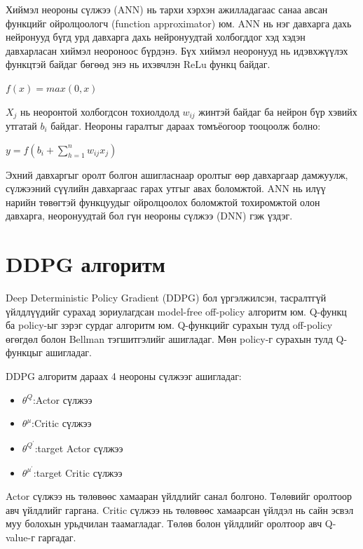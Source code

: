 \documentclass[12pt,A4]{report}
\begin{document}
Хиймэл неороны сүлжээ (ANN) нь тархи хэрхэн ажилладагаас санаа авсан функцийг ойролцоологч (function approximator) юм. ANN нь нэг давхарга дахь нейронууд бүгд урд давхарга дахь нейронуудтай холбогддог хэд хэдэн давхарласан хиймэл неороноос бүрдэнэ. Бүх хиймэл неоронууд нь идэвхжүүлэх функцтэй байдаг бөгөөд энэ нь ихэвчлэн ReLu функц байдаг. 

\begin{center}
$f(x)=max(0, x)$
\end{center}

$X_j$ нь неоронтой холбогдсон тохиолдолд $w_{ij}$ жинтэй байдаг ба нейрон бүр хэвийх утгатай $b_i$ байдаг. Неороны гаралтыг дараах томъёогоор тооцоолж болно:

\begin{center}
$y=f(b_i+\sum_{h=1}^{n}w_{ij} x_j)$
\end{center}

Эхний давхаргыг оролт болгон ашигласнаар оролтыг өөр давхаргаар дамжуулж, сүлжээний сүүлийн давхаргаас гарах утгыг авах боломжтой. ANN нь илүү нарийн төвөгтэй функцуудыг ойролцоолох боломжтой тохиромжтой олон давхарга, неоронуудтай бол гүн неороны сүлжээ (DNN) гэж үздэг. 

\section{DDPG алгоритм}

Deep Deterministic Policy Gradient (DDPG) бол үргэлжилсэн, тасралтгүй үйлдлүүдийг сурахад зориулагдсан model-free off-policy алгоритм юм. Q-функц ба policy-ыг зэрэг сурдаг алгоритм юм. Q-функцийг сурахын тулд off-policy өгөгдөл болон Bellman тэгшитгэлийг ашигладаг. Мөн policy-г сурахын тулд Q-функцыг ашигладаг. 

DDPG алгоритм дараах 4 неороны сүлжээг ашигладаг:
\begin{itemize}
	\item ${\theta}^Q$:Actor сүлжээ
	\item ${\theta}^{\mu}$:Critic сүлжээ
	\item ${\theta}^{Q^{'}}$:target Actor сүлжээ
	\item ${\theta}^{{\mu}^{'}}$:target Critic сүлжээ
\end{itemize} 
 
Actor сүлжээ нь төлөвөөс хамааран үйлдлийг санал болгоно. Төлөвийг оролтоор авч үйлдлийг гаргана. Critic сүлжээ нь төлөвөөс хамаарсан үйлдэл нь сайн эсвэл муу болохын урьдчилан таамагладаг. Төлөв болон үйлдлийг оролтоор авч Q-value-г гаргадаг.
\end{document}

